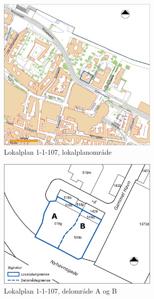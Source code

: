 \begin{figure}[htbp]
	\centering
	\includegraphics[width=0.7\textwidth]{billeder/nylokalplanoversigt.png}
	\caption{Lokalplan 1-1-107, lokalplanområde \citep[ s. 40]{lokalplan}}
	\label{fig:1-1-107}
\end{figure}

\begin{figure}[htbp]
	\centering
	\includegraphics[width=0.7\textwidth]{billeder/tilbygning.png}
	\caption{Lokalplan 1-1-107, delområde A og B \citep[ bilag 1, s. 33]{lokalplan}}
	\label{fig:aogb}
\end{figure}

